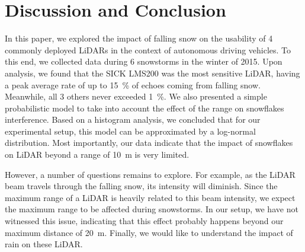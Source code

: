 \section{Discussion and Conclusion}

In this paper, we explored the impact of falling snow on the usability of 4 commonly deployed LiDARs in the context of autonomous driving vehicles. To this end, we collected data during 6 snowstorms in the winter of 2015. Upon analysis, we found that the SICK LMS200 was the most sensitive LiDAR, having a peak average rate of up to 15~\% of echoes coming from falling snow. Meanwhile, all 3 others never exceeded 1~\%. We also presented a simple probabilistic model to take into account the effect of the range on snowflakes interference. Based on a histogram analysis, we concluded that for our experimental setup, this model can be approximated by a log-normal distribution. Most importantly, our data indicate that the impact of snowflakes on LiDAR beyond a range of \SI{10}{\meter} is very limited. 


However, a number of questions remains to explore. For example, as the LiDAR beam travels through the falling snow, its intensity will diminish. Since the maximum range of a LiDAR is heavily related to this beam intensity, we expect the maximum range to be affected during snowstorms. In our setup, we have not witnessed this issue, indicating that this effect probably happens beyond our maximum distance of \SI{20}{\meter}. Finally, we would like to understand the impact of rain on these LiDAR. 

